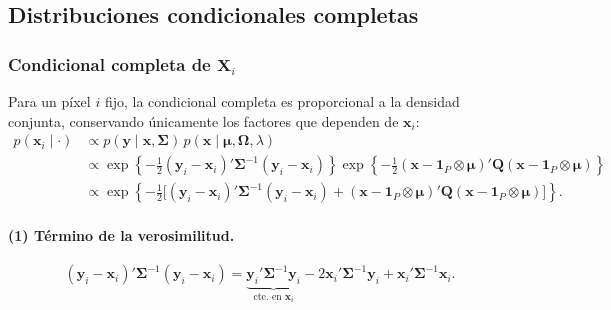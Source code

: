 \documentclass[11pt,a4paper]{article}
\begin{document}
\subsection{Distribuciones condicionales completas}

\subsubsection*{Condicional completa de $\boldsymbol{X}_i$}

Para un píxel $i$ fijo, la condicional completa es proporcional a la densidad conjunta, conservando únicamente los factores que dependen de $\boldsymbol{x}_i$:
\begin{align*}
p(\boldsymbol{x}_i \mid \cdot)
&\propto p(\boldsymbol{y}\mid \boldsymbol{x},\mathbf{\Sigma})\,
p(\boldsymbol{x}\mid \boldsymbol{\mu},\mathbf{\Omega},\lambda)\\
&\propto \exp\left\{-\tfrac{1}{2}(\boldsymbol{y}_i-\boldsymbol{x}_i)'\mathbf{\Sigma}^{-1}(\boldsymbol{y}_i-\boldsymbol{x}_i)\right\}
\exp\left\{-\tfrac{1}{2}(\boldsymbol{x}-\boldsymbol{1}_P\otimes\boldsymbol{\mu})'\mathbf{Q}(\boldsymbol{x}-\boldsymbol{1}_P\otimes\boldsymbol{\mu})\right\}\\
&\propto \exp\left\{-\tfrac{1}{2}\Big[(\boldsymbol{y}_i-\boldsymbol{x}_i)'\mathbf{\Sigma}^{-1}(\boldsymbol{y}_i-\boldsymbol{x}_i)
+(\boldsymbol{x}-\boldsymbol{1}_P\otimes\boldsymbol{\mu})'\mathbf{Q}(\boldsymbol{x}-\boldsymbol{1}_P\otimes\boldsymbol{\mu})\Big]\right\}.
\end{align*}

\paragraph{(1) Término de la verosimilitud.}
\[
(\boldsymbol{y}_i-\boldsymbol{x}_i)'\mathbf{\Sigma}^{-1}(\boldsymbol{y}_i-\boldsymbol{x}_i)
=\underbrace{\boldsymbol{y}_i'\mathbf{\Sigma}^{-1}\boldsymbol{y}_i}_{\text{cte. en }\boldsymbol{x}_i}
-2\boldsymbol{x}_i'\mathbf{\Sigma}^{-1}\boldsymbol{y}_i
+\boldsymbol{x}_i'\mathbf{\Sigma}^{-1}\boldsymbol{x}_i .
\]
\end{document}
